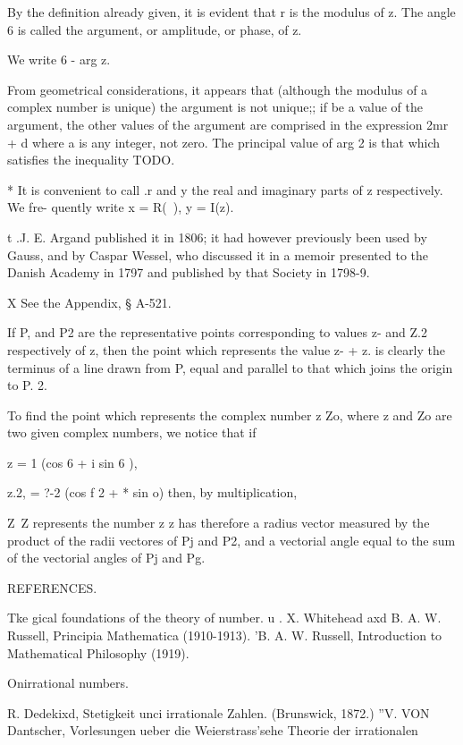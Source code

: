 {By the definition already given, it is evident that r is the modulus
of z. The angle 6 is called the argument, or amplitude, or phase, of
z.

We write 6 - arg z.

From geometrical considerations, it appears that (although the modulus
of a complex number is unique) the argument is not unique;; if be a
value of the argument, the other values of the argument are comprised
in the expression 2mr + d where a is any integer, not zero. The
principal value of arg 2 is that which satisfies the inequality TODO.

* It is convenient to call .r and y the real and imaginary parts of z
respectively. We fre- quently write x = R(~), y = I(z).

t .J. E. Argand published it in 1806; it had however previously been
used by Gauss, and by Caspar Wessel, who discussed it in a memoir
presented to the Danish Academy in 1797 and published by that Society
in 1798-9.

X See the Appendix, § A-521.

%
%

If P, and P2 are the representative points corresponding to values z-
and Z.2 respectively of z, then the point which represents the value
z- + z. is clearly the terminus of a line drawn from P, equal and
parallel to that which joins the origin to P. 2.

To find the point which represents the complex number z Zo, where z
and Zo are two given complex numbers, we notice that if

z = 1 (cos 6 + i sin 6 ),

z.2, = ?-2 (cos f 2 + * sin o) then, by multiplication,

Z\ Z%
represents the number z z has therefore a radius vector measured by
the product of the radii vectores of Pj and P2, and a vectorial angle
equal to the sum of the vectorial angles of Pj and Pg.

REFERENCES.

Tke gical foundations of the theory of number. u . X. Whitehead axd B.
A. W. Russell, Principia Mathematica (1910-1913). 'B. A. W. Russell,
Introduction to Mathematical Philosophy (1919).

Onirrational numbers.

R. Dedekixd, Stetigkeit unci irrationale Zahlen. (Brunswick, 1872.)
''V. VON Dantscher, Vorlesungen ueber die Weierstrass'sehe Theorie der
irrationalen

}

